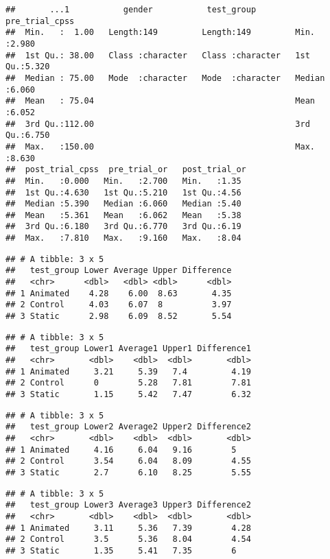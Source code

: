 \documentclass[
]{article}
\begin{document}
\begin{verbatim}
##       ...1           gender           test_group        pre_trial_cpss 
##  Min.   :  1.00   Length:149         Length:149         Min.   :2.980  
##  1st Qu.: 38.00   Class :character   Class :character   1st Qu.:5.320  
##  Median : 75.00   Mode  :character   Mode  :character   Median :6.060  
##  Mean   : 75.04                                         Mean   :6.052  
##  3rd Qu.:112.00                                         3rd Qu.:6.750  
##  Max.   :150.00                                         Max.   :8.630  
##  post_trial_cpss  pre_trial_or   post_trial_or 
##  Min.   :0.000   Min.   :2.700   Min.   :1.35  
##  1st Qu.:4.630   1st Qu.:5.210   1st Qu.:4.56  
##  Median :5.390   Median :6.060   Median :5.40  
##  Mean   :5.361   Mean   :6.062   Mean   :5.38  
##  3rd Qu.:6.180   3rd Qu.:6.770   3rd Qu.:6.19  
##  Max.   :7.810   Max.   :9.160   Max.   :8.04
\end{verbatim}

\begin{verbatim}
## # A tibble: 3 x 5
##   test_group Lower Average Upper Difference
##   <chr>      <dbl>   <dbl> <dbl>      <dbl>
## 1 Animated    4.28    6.00  8.63       4.35
## 2 Control     4.03    6.07  8          3.97
## 3 Static      2.98    6.09  8.52       5.54
\end{verbatim}

\begin{verbatim}
## # A tibble: 3 x 5
##   test_group Lower1 Average1 Upper1 Difference1
##   <chr>       <dbl>    <dbl>  <dbl>       <dbl>
## 1 Animated     3.21     5.39   7.4         4.19
## 2 Control      0        5.28   7.81        7.81
## 3 Static       1.15     5.42   7.47        6.32
\end{verbatim}

\begin{verbatim}
## # A tibble: 3 x 5
##   test_group Lower2 Average2 Upper2 Difference2
##   <chr>       <dbl>    <dbl>  <dbl>       <dbl>
## 1 Animated     4.16     6.04   9.16        5   
## 2 Control      3.54     6.04   8.09        4.55
## 3 Static       2.7      6.10   8.25        5.55
\end{verbatim}

\begin{verbatim}
## # A tibble: 3 x 5
##   test_group Lower3 Average3 Upper3 Difference2
##   <chr>       <dbl>    <dbl>  <dbl>       <dbl>
## 1 Animated     3.11     5.36   7.39        4.28
## 2 Control      3.5      5.36   8.04        4.54
## 3 Static       1.35     5.41   7.35        6
\end{verbatim}
\end{document}

